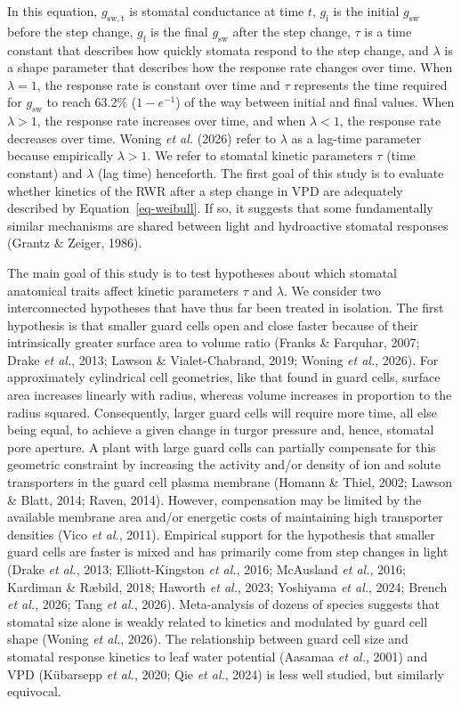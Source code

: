 \documentclass[
  letterpaper,
  DIV=11,
  numbers=noendperiod]{scrartcl}
\newcommand{\gi}{$g_\mathrm{i}$}
\newcommand{\gf}{$g_\mathrm{f}$}
\newcommand{\gsw}{$g_\mathrm{sw}$}
\begin{document}
In this equation, \(g_\mathrm{sw,t}\) is stomatal conductance at time
\(t\), \gi{} is the initial \gsw{} before the step change, \gf{} is the
final \gsw{} after the step change, \(\tau\) is a time constant that
describes how quickly stomata respond to the step change, and
\(\lambda\) is a shape parameter that describes how the response rate
changes over time. When \(\lambda = 1\), the response rate is constant
over time and \(\tau\) represents the time required for \gsw{} to reach
63.2\% (\(1 - e^{-1}\)) of the way between initial and final values.
When \(\lambda > 1\), the response rate increases over time, and when
\(\lambda < 1\), the response rate decreases over time. Woning \emph{et
al.} (2026) refer to \(\lambda\) as a lag-time parameter because
empirically \(\lambda > 1\). We refer to stomatal kinetic parameters
\(\tau\) (time constant) and \(\lambda\) (lag time) henceforth. The
first goal of this study is to evaluate whether kinetics of the RWR
after a step change in VPD are adequately described by
Equation~\ref{eq-weibull}. If so, it suggests that some fundamentally
similar mechanisms are shared between light and hydroactive stomatal
responses (Grantz \& Zeiger, 1986).

The main goal of this study is to test hypotheses about which stomatal
anatomical traits affect kinetic parameters \(\tau\) and \(\lambda\). We
consider two interconnected hypotheses that have thus far been treated
in isolation. The first hypothesis is that smaller guard cells open and
close faster because of their intrinsically greater surface area to
volume ratio (Franks \& Farquhar, 2007; Drake \emph{et al.}, 2013;
Lawson \& Vialet-Chabrand, 2019; Woning \emph{et al.}, 2026). For
approximately cylindrical cell geometries, like that found in guard
cells, surface area increases linearly with radius, whereas volume
increases in proportion to the radius squared. Consequently, larger
guard cells will require more time, all else being equal, to achieve a
given change in turgor pressure and, hence, stomatal pore aperture. A
plant with large guard cells can partially compensate for this geometric
constraint by increasing the activity and/or density of ion and solute
transporters in the guard cell plasma membrane (Homann \& Thiel, 2002;
Lawson \& Blatt, 2014; Raven, 2014). However, compensation may be
limited by the available membrane area and/or energetic costs of
maintaining high transporter densities (Vico \emph{et al.}, 2011).
Empirical support for the hypothesis that smaller guard cells are faster
is mixed and has primarily come from step changes in light (Drake
\emph{et al.}, 2013; Elliott-Kingston \emph{et al.}, 2016; McAusland
\emph{et al.}, 2016; Kardiman \& Ræbild, 2018; Haworth \emph{et al.},
2023; Yoshiyama \emph{et al.}, 2024; Brench \emph{et al.}, 2026; Tang
\emph{et al.}, 2026). Meta-analysis of dozens of species suggests that
stomatal size alone is weakly related to kinetics and modulated by guard
cell shape (Woning \emph{et al.}, 2026). The relationship between guard
cell size and stomatal response kinetics to leaf water potential
(Aasamaa \emph{et al.}, 2001) and VPD (Kübarsepp \emph{et al.}, 2020;
Qie \emph{et al.}, 2024) is less well studied, but similarly equivocal.
\end{document}
